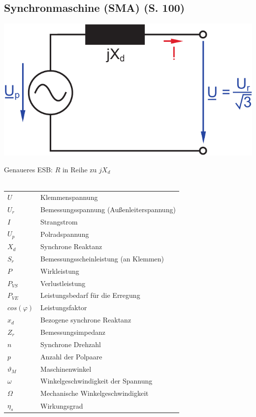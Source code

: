\documentclass[a4paper,twocolumn,10pt]{article}
\begin{document}
\subsection{Synchronmaschine (SMA) (S. 100)}
\begin{center}
\includegraphics[width=0.7\columnwidth]{Grafiken/Synchronmaschine}
\end{center}
\vspace{0pt}
Genaueres ESB: $R$ in Reihe zu $jX_d$\\\\
\begin{tabular}{ll}
$U$ & Klemmenspannung\\
$U_r$ & Bemessungsspannung (Außenleiterspannung)\\
$I$ & Strangstrom\\
$U_p$ & Polradspannung\\
$X_d$ & Synchrone Reaktanz\\
$S_r$ & Bemessungsscheinleistung (an Klemmen)\\
$P$ & Wirkleistung\\
$P_{VS}$ & Verlustleistung\\
$P_{VE}$ & Leistungsbedarf für die Erregung\\
$cos(\varphi)$ & Leistungsfaktor\\
$x_d$ & Bezogene synchrone Reaktanz\\
$Z_r$ & Bemessungsimpedanz\\
$n$ & Synchrone Drehzahl\\
$p$ & Anzahl der Polpaare\\
$\vartheta_M$ & Maschinenwinkel\\
$\omega$ & Winkelgeschwindigkeit der Spannung\\
$\Omega$ & Mechanische Winkelgeschwindigkeit\\
$\eta_s$ & Wirkungsgrad
\end{tabular}
\end{document}
